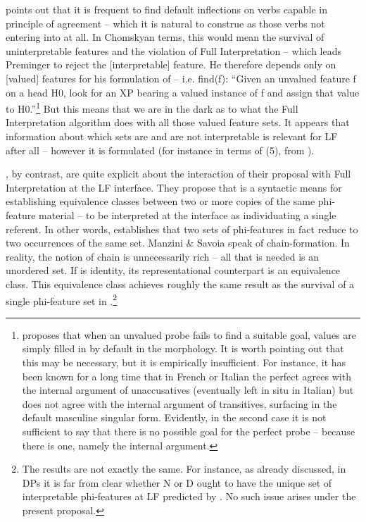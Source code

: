 \documentclass[output=paper]{langsci/langscibook}
\begin{document}
\citet{Preminger2014}{} points out that it is frequent to find default inflections on verbs capable in principle of agreement – which it is natural to construe as those verbs not entering into  at all.{} In Chomskyan terms, this would mean the survival of uninterpretable features and the violation of Full Interpretation – which leads Preminger to reject the [interpretable] feature. He therefore {depends only on [valued] features for his formulation of  – i.e.} {fi}{nd(f): “Given an unvalued feature f on a head H0, look for an XP bearing a valued instance of f and assign that value to H0.”}\footnote{\citet{Preminger2014} proposes that when an unvalued probe fails to find a suitable goal, values are simply filled in by default in the morphology. It is worth pointing out that this may be necessary, but it is empirically insufficient. For instance, it has been known for a long time \citep{Kayne1989} that in French or Italian the perfect  agrees with the internal argument of unaccusatives (eventually left in situ in Italian) but does not agree with the internal argument of transitives, surfacing in the default masculine singular form. Evidently, in the second case it is not sufficient to say that there is no possible goal for the perfect  probe – because there is one, namely the internal argument.} { But this means that we are in the dark as to what the Full Interpretation algorithm does with all those valued feature sets. It appears that information about which sets are and are not interpretable is relevant for LF after all – however it is formulated (for instance in terms of (5), from \citealt{Baker2008}).}

   \citet{Manzini2007}, by contrast, are quite explicit about the interaction of their proposal with Full Interpretation at the LF interface. They propose that  is a syntactic means for establishing equivalence classes between two or more copies of the same phi-feature material – to be interpreted at the interface as individuating a single referent. In other words,  establishes that two sets of phi-features in fact reduce to two occurrences of the same set. Manzini \& Savoia speak of chain-formation. In reality, the notion of chain is unnecessarily rich – all that is needed is an unordered set. If  is identity, its representational counterpart is an equivalence class. This equivalence class achieves roughly the same result as the survival of a single phi-feature set in \citet{Chomsky2000,Chomsky2001Derivation}.\footnote{The results are not exactly the same. For instance, {as already discussed, in DPs it is far from clear whether N or D ought to have the unique set of interpretable phi-featu}{r}{es at LF}{ predicted by \citet{Chomsky2001Derivation}. No such issue arises under the present proposal.}}
\end{document}
